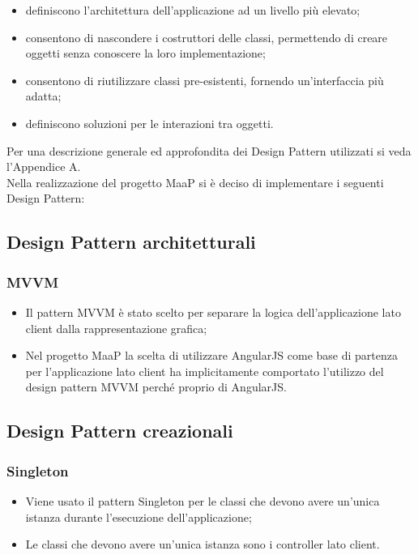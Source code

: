 \begin{itemize}
\item {} definiscono l'architettura dell'applicazione ad un livello più elevato;
\item {} consentono di nascondere i costruttori delle classi, permettendo di creare oggetti senza conoscere la loro implementazione;
\item {} consentono di riutilizzare classi pre-esistenti, fornendo un'interfaccia più adatta;
\item {} definiscono soluzioni per le interazioni tra oggetti.
\end{itemize}
Per una descrizione generale ed approfondita dei Design Pattern utilizzati si veda l'Appendice A.\\
Nella realizzazione del progetto MaaP si è deciso di implementare i seguenti Design Pattern:\\

\subsection{Design Pattern architetturali}
\subsubsection{MVVM}
\begin{itemize}
\item {} Il pattern MVVM è stato scelto per separare la logica dell'applicazione lato client dalla rappresentazione grafica; 
\item {} Nel progetto MaaP la scelta di utilizzare AngularJS come base di partenza per l'applicazione lato client ha implicitamente comportato l'utilizzo del design pattern MVVM perché proprio di AngularJS.
\end{itemize}

\subsection{Design Pattern creazionali}
\subsubsection{Singleton}
\begin{itemize}
\item {} Viene usato il pattern Singleton per le classi che devono avere un'unica istanza durante l'esecuzione dell'applicazione; 
\item {} Le classi che devono avere un'unica istanza sono i controller lato client.
\end{itemize}


